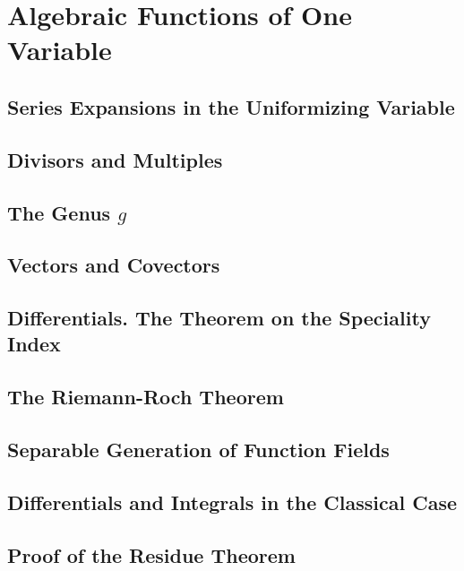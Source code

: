 \section{Algebraic Functions of One Variable}

\subsection{Series Expansions in the Uniformizing Variable}

\subsection{Divisors and Multiples}

\subsection{The Genus $g$}

\subsection{Vectors and Covectors}

\subsection{Differentials. The Theorem on the Speciality Index}

\subsection{The Riemann-Roch Theorem}

\subsection{Separable Generation of Function Fields}

\subsection{Differentials and Integrals in the Classical Case}

\subsection{Proof of the Residue Theorem}